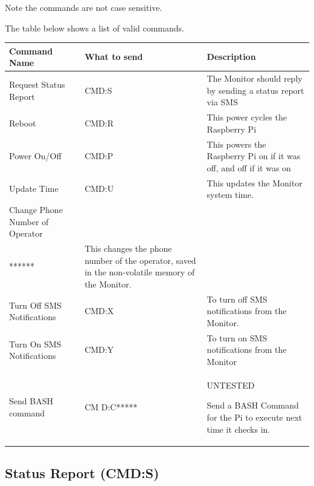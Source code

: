 \documentclass[
  letterpaper,
]{scrbook}
\begin{document}
Note the commands are not case sensitive.

The table below shows a list of valid commands.

\begin{longtable}[]{@{}
  >{\raggedright\arraybackslash}p{}
  >{\raggedright\arraybackslash}p{}
  >{\raggedright\arraybackslash}p{}@{}}
\toprule\noalign{}
\begin{minipage}[b]{\linewidth}\raggedright
\textbf{Command Name}
\end{minipage} & \begin{minipage}[b]{\linewidth}\raggedright
\textbf{What to send}
\end{minipage} & \begin{minipage}[b]{\linewidth}\raggedright
\textbf{Description}
\end{minipage} \\
\midrule\noalign{}
\endhead
\bottomrule\noalign{}
\endlastfoot
Request Status Report & CMD:S & The Monitor should reply by sending a
status report via SMS \\
Reboot & CMD:R & This power cycles the Raspberry Pi \\
Power On/Off & CMD:P & This powers the Raspberry Pi on if it was off,
and off if it was on \\
Update Time & CMD:U & This updates the Monitor system time. \\
Change Phone Number of Operator &
\begin{minipage}[t]{\linewidth}\raggedright
CMD:M+27**\\
*******\strut
\end{minipage} & This changes the phone number of the operator, saved in
the non-volatile memory of the Monitor. \\
Turn Off SMS Notifications & CMD:X & To turn off SMS notifications from
the Monitor. \\
Turn On SMS Notifications & CMD:Y & To turn on SMS notifications from
the Monitor \\
Send BASH command & CM D:C***** & UNTESTED

Send a BASH Command for the Pi to execute next time it checks in. \\
\end{longtable}

\subsection{Status Report (CMD:S)}\label{status-report-cmds}
\end{document}
